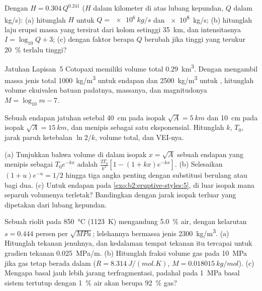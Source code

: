 \begin{exercise}[$\star$]\label{exo:b2:eruptive-styles:3}
Dengan $H = 0.304\,Q^{0.241}$ ($H$ dalam kilometer di atas lubang kepundan, $Q$ dalam
\unit{kg/s}): (a) hitunglah $H$ untuk $Q = \qty{e6}{kg/s}$ dan \qty{e8}{kg/s};
(b) hitunglah laju erupsi massa yang tersirat dari kolom setinggi \qty{35}{km}, dan
intensitasnya $I = \log_{10}Q + 3$; (c) dengan faktor berapa $Q$ berubah jika tinggi yang terukur
\qty{20}{\percent} terlalu tinggi?
\end{exercise}

\begin{exercise}[$\star$]\label{exo:b2:eruptive-styles:4}
Jatuhan Lapisan~5 Cotopaxi memiliki volume total \qty{0.29}{km^3}. Dengan mengambil
massa jenis total \qty{1000}{kg/m^3} untuk endapan dan \qty{2500}{kg/m^3} untuk
, hitunglah volume ekuivalen batuan padatnya, massanya, dan magnitudonya
$M = \log_{10}m - 7$.
\end{exercise}

\begin{exercise}[$\star\star$]\label{exo:b2:eruptive-styles:5}
Sebuah endapan jatuhan setebal \qty{40}{cm} pada isopak $\sqrt A = \qty{5}{km}$
dan \qty{10}{cm} pada isopak $\sqrt A = \qty{15}{km}$, dan menipis sebagai satu
eksponensial. Hitunglah $k$, $T_0$, jarak paruh ketebalan $\ln 2/k$, volume
total, dan VEI-nya.
\end{exercise}

\begin{exercise}[$\star\star$]\label{exo:b2:eruptive-styles:6}
(a) Tunjukkan bahwa volume di dalam isopak $x = \sqrt A$ sebuah endapan yang menipis
sebagai $T_0e^{-kx}$ adalah $\frac{2T_0}{k^2}[1 - (1 + kx)e^{-kx}]$. (b) Selesaikan $(1 + u)e^{-u} =
1/2$ hingga tiga angka penting dengan substitusi berulang atau bagi dua. (c) Untuk
endapan pada \cref{exo:b2:eruptive-styles:5}, di luar isopak mana separuh volumenya terletak? Bandingkan
dengan jarak isopak terluar yang dipetakan dari lubang kepundan.
\end{exercise}

\begin{exercise}[$\star\star$]\label{exo:b2:eruptive-styles:7}
Sebuah  riolit pada \qty{850}{\celsius} (\qty{1123}{K}) mengandung
\qty{5.0}{\percent} air, dengan kelarutan $s = 0.444$ persen per
$\sqrt{\unit{MPa}}$; lelehannya bermassa jenis \qty{2300}{kg/m^3}. (a) Hitunglah
tekanan jenuhnya, dan kedalaman tempat tekanan itu tercapai untuk gradien
tekanan \qty{0.025}{MPa/m}. (b) Hitunglah fraksi volume gas pada
\qty{10}{MPa} jika gas tetap berada dalam  ($R = \qty{8.314}{J/(mol.K)}$, $M =
\qty{0.018015}{kg/mol}$). (c) Mengapa  basal jauh lebih jarang terfragmentasi,
padahal pada \qty{1}{MPa} basal sistem tertutup dengan \qty{1}{\percent}
air akan berupa \qty{92}{\percent} gas?
\end{exercise}

